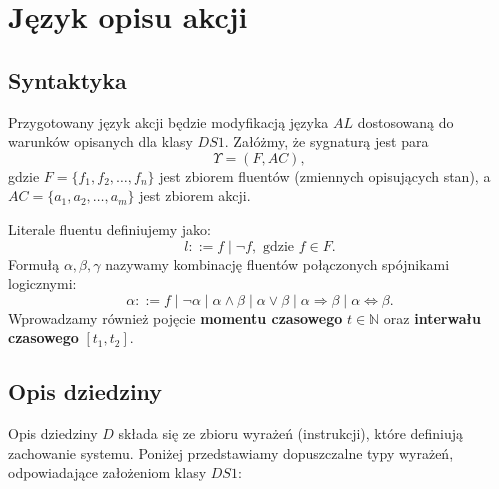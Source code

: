 \documentclass[12pt,a4paper]{article}
\begin{document}
\section{Język opisu akcji}

\subsection{Syntaktyka}

Przygotowany język akcji będzie modyfikacją języka $AL$ dostosowaną do warunków opisanych dla klasy $DS1$. Załóżmy, że sygnaturą jest para
\[
\Upsilon = (F, AC),
\]
gdzie $F = \{f_1, f_2, \dots, f_n\}$ jest zbiorem fluentów (zmiennych opisujących stan), a $AC = \{a_1, a_2, \dots, a_m\}$ jest zbiorem akcji. 

Literale fluentu definiujemy jako:
\[
l ::= f \mid \neg f, \text{ gdzie } f \in F.
\]
Formułą $\alpha, \beta, \gamma$ nazywamy kombinację fluentów połączonych spójnikami logicznymi:
\[
\alpha ::= f \mid \neg \alpha \mid \alpha \land \beta \mid \alpha \lor \beta \mid \alpha \Rightarrow \beta \mid \alpha \Leftrightarrow \beta.
\]
Wprowadzamy również pojęcie \textbf{momentu czasowego} $t \in \mathbb{N}$ oraz \textbf{interwału czasowego} $[t_1, t_2]$.

\subsection{Opis dziedziny}

Opis dziedziny $D$ składa się ze zbioru wyrażeń (instrukcji), które definiują zachowanie systemu. Poniżej przedstawiamy dopuszczalne typy wyrażeń, odpowiadające założeniom klasy $DS1$:
\end{document}
